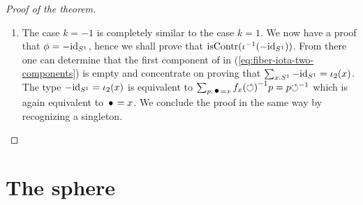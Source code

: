 \documentclass[english,a4]{article}
\def\blank{\_}%
\begin{document}
\begin{proof}[Proof of the theorem]
\begin{enumerate}
    One can immediately see that the second component of the right
    hand-side in equation~(\ref{eq:fiber-iota-two-components}) is
    empty when instantiated with $\id_\Sc$ for $\phi$: indeed,
    $\false$ being a proposition and $\Sc$ being connected, one only
    need to check that $\id_\Sc = \iota_2(\base)$ is contradictory;
    and because $\iota_2(\base) \jdeq -\id_\Sc$, it follows from
    lemma~\ref{lemma:id-not-equal-oppid}.

    Hence it remains to prove that $\sum_{x:\Sc}\id_\Sc=\iota_1(x)$ is
    contractible. For $x:\Sc$, the type $\id_\Sc = \iota_1(x)$ is
    equivalent (through first function extensionality and then
    $\Sc$-induction) to
    $\sum_{p:\base=\iota_1(x)(\base)}\pathover p T \Sloop p$ where $T$
    is the type family $y\mapsto y=\iota_1(x)(y)$. Now
    $\iota_1(x)(\base)\jdeq x$ and the transport over the loop
    $\Sloop$ in the type family $T$ is given by
    $\iota_1(x)(\Sloop) \blank \inv \Sloop$. In other words,
    \begin{equation}
      \label{eq:10}
      (\id_\Sc = \iota_1(x)) \weq \sum_{p:\base = x}f_x(\Sloop)p = p {\Sloop}
    \end{equation}
    By induction on $p:\base=x$, one can see that the proposition
    $f_x(\Sloop)p=p\Sloop$ is always satisfied. In the end, one has
    \begin{equation}
      \label{eq:11}
      \left(\sum_{x:\Sc}\id_\Sc=\iota_1(x)\right)
      \weq
      \left(\sum_{x:\Sc}\base=x\right)
    \end{equation}
    The type on the right is a singleton, hence contractible. This
    concludes the case $k=1$.
      \item The case $k=-1$ is completely similar to the case $k=1$. We
    now have a proof that $\phi = -\mathord{\mathrm{id}}_{S^1}$, hence we shall prove that
    $\mathrm{isContr}({\iota}^{-1}(-\mathord{\mathrm{id}}_{S^1}))$. From there one can determine that
    the first component of in (\ref{eq:fiber-iota-two-components}) is
    empty and concentrate on proving that
    $\sum_{x:{S^1}}-\mathord{\mathrm{id}}_{S^1} = \iota_2(x)$. The type
    $-\mathord{\mathrm{id}}_{S^1} = \iota_2(x)$ is equivalent to
    $\sum_{p:\base = x}\inv{f_x(\Sloop)}p=p\inv\Sloop$ which is again
    equivalent to $\base=x$. We conclude the proof in the same way by
    recognizing a singleton.
  \end{enumerate}
\end{proof}

\section{The sphere}
\end{document}
